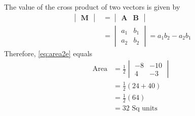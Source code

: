 \documentclass[12pt]{article}
\newcommand{\mydet}[1]{\ensuremath{\begin{vmatrix}#1\end{vmatrix}}}
\providecommand{\brak}[1]{\ensuremath{\left(#1\right)}}
\let\vec\mathbf
\begin{document}
\begin{enumerate}
\begin{enumerate}
The value of the cross product of two vectors is given by
\begin{align}
  \label{eq:det2e}
  \mydet{\vec{M}} &= \mydet{\vec{A} & \vec{B}} 
  \\
  &= \mydet{a_1 & b_1\\a_2 & b_2} = a_1b_2 - a_2 b_1
\end{align}
		Therefore, \eqref{eq:area2e} equals \\
\begin{align}
\text{Area} &=	\frac{1}{2}\mydet{-8 & -10\\4 & -3}  \\
	&=	\frac{1}{2}\brak{24+40}  \\
	&=  \frac{1}{2}\brak{64}  \\ 
	&=  32 \text{ Sq units}		       
\end{align}

\end{enumerate}



\end{enumerate}
\end{document}
